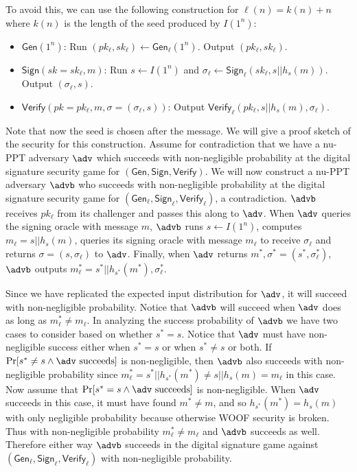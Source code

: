 \documentclass[12pt]{tufte-book}
\newcommand{\Gen}{\mathsf{Gen}}
\newcommand{\Sign}{\mathsf{Sign}}
\newcommand{\Verify}{\mathsf{Verify}}
\begin{document}
To avoid this, we can use the following construction for $\ell(n) = k(n) + n$ where $k(n)$ is the length of the seed produced by $I(1^n)$: 
\begin{itemize}
    \item $\Gen(1^n)$: Run $(pk_\ell, sk_\ell) \leftarrow \Gen_\ell(1^n)$. Output $(pk_\ell,sk_\ell)$.

    \item $\Sign(sk=sk_\ell, m)$: Run $s \leftarrow I(1^n)$ and $\sigma_\ell \leftarrow \Sign_\ell(sk_\ell, s || h_s(m))$. Output $(\sigma_\ell, s)$. 

    \item $\Verify(pk=pk_\ell, m, \sigma = (\sigma_\ell, s))$: Output $\Verify_\ell(pk_\ell, s || h_s(m), \sigma_\ell)$. 
\end{itemize}
Note that now the seed is chosen after the message. 
We will give a proof sketch of the security for this construction. 
Assume for contradiction that we have a nu-PPT adversary $\adv$ which succeeds with non-negligible probability at the digital signature security game for $(\Gen, \Sign, \Verify)$. 
We will now construct a nu-PPT adversary $\advb$ who succeeds with non-negligible probability at the digital signature security game for $(\Gen_\ell, \Sign_\ell, \Verify_\ell)$, a contradiction. 
$\advb$ receives $pk_\ell$ from its challenger and passes this along to $\adv$. 
When $\adv$ queries the signing oracle with message $m$, $\advb$ runs $s \leftarrow I(1^n)$, computes $m_{\ell} = s || h_{s}(m)$, queries its signing oracle with message $m_{\ell}$ to receive $\sigma_\ell$ and returns $\sigma = (s, \sigma_{\ell})$ to $\adv$. 
Finally, when $\adv$ returns $m^*, \sigma^* = (s^*, \sigma_{\ell}^*)$, $\advb$ outputs $m^*_{\ell} = s^* || h_{s^*}(m^*), \sigma_{\ell}^*$. 

Since we have replicated the expected input distribution for $\adv$, it will succeed with non-negligible probability. 
Notice that $\advb$ will succeed when $\adv$ does as long as $m^*_{\ell} \not = m_{\ell}$. 
In analyzing the success probability of $\advb$ we have two cases to consider based on whether $s^* = s$. 
Notice that $\adv$ must have non-negligible success either when $s^* = s$ or when $s^* \not = s$ or both. 
If $\Pr[s^* \not = s \land \adv \text{ succeeds}]$ is non-negligible, then $\advb$ also succeeds with non-negligible probability since $m^*_{\ell} = s^* || h_{s^*}(m^*) \not = s || h_{s}(m) = m_{\ell}$ in this case. 
Now assume that $\Pr[s^* = s \land \adv \text{ succeeds}]$ is non-negligible. When $\adv$ succeeds in this case, it must have found $m^* \not = m$, and so $h_{s^*}(m^*) = h_{s}(m)$ with only negligible probability because otherwise WOOF security is broken. 
Thus with non-negligible probability $m^*_{\ell} \not = m_{\ell}$ and $\advb$ succeeds as well. 
Therefore either way $\advb$ succeeds in the digital signature game against $(\Gen_\ell, \Sign_\ell, \Verify_\ell)$ with non-negligible probability. 
\end{document}
